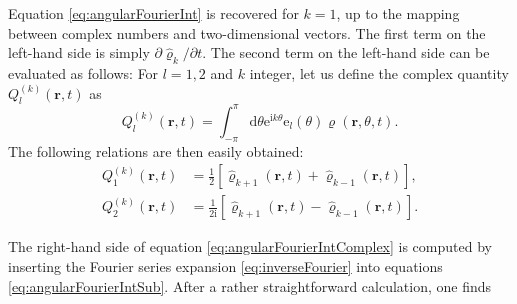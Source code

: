 \documentclass{article}
\begin{document}
Equation \eqref{eq:angularFourierInt} is recovered for $k = 1$, up to the mapping between complex numbers and two-dimensional vectors. The first term on the left-hand side is simply $\partial \hat{\varrho}_k/\partial t$. The second term on the left-hand side can be evaluated as follows: For $l=1,2$ and $k$ integer, let us define the complex quantity $Q_{l}^{\left( k \right)}\left( \mathbf{r},t \right)$ as 
\begin{equation}
    Q_l^{(k)}(\mathbf{r},t)=\int_{-\pi}^\pi\mathrm{d}\theta \mathrm{e}^{\mathrm{i}k\theta}\mathrm{e}_l(\theta)\varrho(\mathbf{r},\theta,t).
\end{equation}
The following relations are then easily obtained:
\begin{equation}
    \begin{aligned}
        Q_{1}^{(k)}(\mathbf{r},t)&=\frac{1}{2}[\hat{\varrho}_{k+1}(\mathbf{r},t)+\hat{\varrho}_{k-1}(\mathbf{r},t)],\\
        Q_{2}^{(k)}(\mathbf{r},t)&=\frac{1}{2\mathrm{i}}[\hat{\varrho}_{k+1}(\mathbf{r},t)-\hat{\varrho}_{k-1}(\mathbf{r},t)].
    \end{aligned}
\end{equation}


The right-hand side of equation \eqref{eq:angularFourierIntComplex} is computed by inserting the Fourier series expansion \eqref{eq:inverseFourier} into equations \eqref{eq:angularFourierIntSub}. 
After a rather straightforward calculation, one finds



\end{document}
